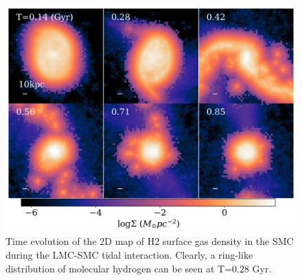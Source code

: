 \documentclass[fleqn,usenatbib]{mnras}
\begin{document}
\begin{figure}
 \centering
 \includegraphics[width=15cm]{13_kenji.png}
 \caption{Time evolution of the 2D map of
H2 surface gas density  in the SMC during the LMC-SMC tidal interaction. Clearly, a ring-like distribution of molecular hydrogen can be
seen at T=0.28 Gyr.}
 \label{fig:11KenH2}
\end{figure}
\end{document}
